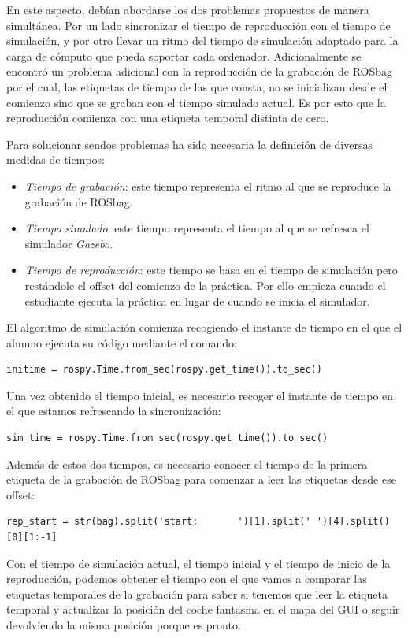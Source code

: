 En este aspecto, debían abordarse los dos problemas propuestos de manera simultánea. Por un lado sincronizar el tiempo de reproducción con el tiempo de simulación, y por otro llevar un ritmo del tiempo de simulación adaptado para la carga de cómputo que pueda soportar cada ordenador. Adicionalmente se encontró un problema adicional con la reproducción de la grabación de ROSbag por el cual, las etiquetas de tiempo de las que consta, no se inicializan desde el comienzo sino que se graban con el tiempo simulado actual. Es por esto que la reproducción comienza con una etiqueta temporal distinta de cero.

Para solucionar sendos problemas ha sido necesaria la definición de diversas medidas de tiempos:

\begin{itemize}
	\item \textit{Tiempo de grabación}: este tiempo representa el ritmo al que se reproduce la grabación de ROSbag.
	\item \textit{Tiempo simulado}: este tiempo representa el tiempo al que se refresca el simulador \textit{Gazebo}.
	\item \textit{Tiempo de reproducción}: este tiempo se basa en el tiempo de simulación pero restándole el offset del comienzo de la práctica. Por ello empieza cuando el estudiante ejecuta la práctica en lugar de cuando se inicia el simulador.
\end{itemize}

El algoritmo de simulación comienza recogiendo el instante de tiempo en el que el alumno ejecuta su código mediante el comando:

\lstset{language=Python, breaklines=true, basicstyle=\footnotesize}
\begin{lstlisting}[frame=single]
initime = rospy.Time.from_sec(rospy.get_time()).to_sec()
\end{lstlisting}

Una vez obtenido el tiempo inicial, es necesario recoger el instante de tiempo en el que estamos refrescando la sincronización:

\lstset{language=Python, breaklines=true, basicstyle=\footnotesize}
\begin{lstlisting}[frame=single]
sim_time = rospy.Time.from_sec(rospy.get_time()).to_sec()
\end{lstlisting}

Además de estos dos tiempos, es necesario conocer el tiempo de la primera etiqueta de la grabación de ROSbag para comenzar a leer las etiquetas desde ese offset:
\lstset{language=Python, breaklines=true, basicstyle=\footnotesize}
\begin{lstlisting}[frame=single]
rep_start = str(bag).split('start:       ')[1].split(' ')[4].split()[0][1:-1]
\end{lstlisting}
Con el tiempo de simulación actual, el tiempo inicial y el tiempo de inicio de la reproducción, podemos obtener el tiempo con el que vamos a comparar las etiquetas temporales de la grabación para saber si tenemos que leer la etiqueta temporal y actualizar la posición del coche fantasma en el mapa del GUI o seguir devolviendo la misma posición porque es pronto.

